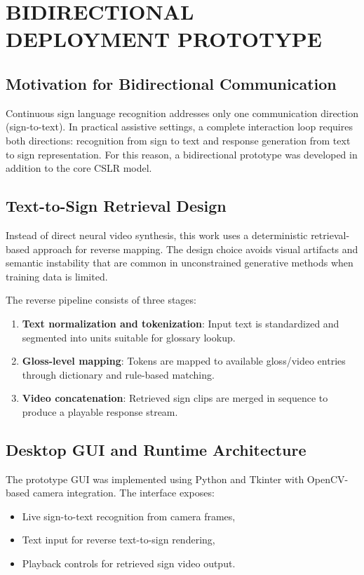 \chapter{BIDIRECTIONAL DEPLOYMENT PROTOTYPE}

\section{Motivation for Bidirectional Communication}

Continuous sign language recognition addresses only one communication direction (sign-to-text). In practical assistive settings, a complete interaction loop requires both directions: recognition from sign to text and response generation from text to sign representation. For this reason, a bidirectional prototype was developed in addition to the core CSLR model.

\section{Text-to-Sign Retrieval Design}

Instead of direct neural video synthesis, this work uses a deterministic retrieval-based approach for reverse mapping. The design choice avoids visual artifacts and semantic instability that are common in unconstrained generative methods when training data is limited.

The reverse pipeline consists of three stages:
\begin{enumerate}
    \item \textbf{Text normalization and tokenization}: Input text is standardized and segmented into units suitable for glossary lookup.
    \item \textbf{Gloss-level mapping}: Tokens are mapped to available gloss/video entries through dictionary and rule-based matching.
    \item \textbf{Video concatenation}: Retrieved sign clips are merged in sequence to produce a playable response stream.
\end{enumerate}

\section{Desktop GUI and Runtime Architecture}

The prototype GUI was implemented using Python and Tkinter with OpenCV-based camera integration. The interface exposes:
\begin{itemize}
    \item Live sign-to-text recognition from camera frames,
    \item Text input for reverse text-to-sign rendering,
    \item Playback controls for retrieved sign video output.
\end{itemize}

